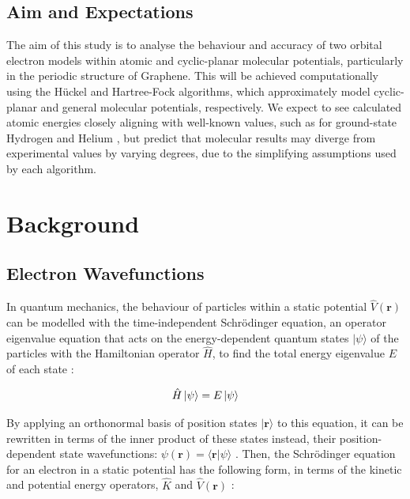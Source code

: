 \section{Aim and Expectations}

The aim of this study is to analyse the behaviour and accuracy of two orbital electron models within atomic and cyclic-planar molecular potentials, particularly in the periodic structure of Graphene. This will be achieved computationally using the Hückel \cite{yates_huckel_2012} and Hartree-Fock \cite{quiney_art_nodate} algorithms, which approximately model cyclic-planar and general molecular potentials, respectively. We expect to see calculated atomic energies closely aligning with well-known values, such as for ground-state Hydrogen \cite{pinke_origin_2025} and Helium \cite{nascimento_determination_2005}, but predict that molecular results may diverge from experimental values by varying degrees, due to the simplifying assumptions used by each algorithm. 

\chapter{Background}\label{ch:background}

\section{Electron Wavefunctions}\label{sec:electronwavefunction}

In quantum mechanics, the behaviour of particles within a static potential $\hat{V}(\boldsymbol{r})$ can be modelled with the time-independent Schrödinger equation, an operator eigenvalue equation that acts on the energy-dependent quantum states $|\psi\rangle$ of the particles with the Hamiltonian operator $\hat{H}$, to find the total energy eigenvalue $E$ of each state \cite{nalewajski_perspectives_2012}:

\begin{equation}
\hat{H}\thinspace|\psi\rangle=E\thinspace|\psi\rangle
\end{equation}

By applying an orthonormal basis of position states $|\boldsymbol{r}\rangle$ to this equation, it can be rewritten in terms of the inner product of these states instead, their position-dependent state wavefunctions: $\psi(\boldsymbol{r})=\langle\boldsymbol{r}|\psi\rangle$ \cite{nalewajski_perspectives_2012}. Then, the Schrödinger equation for an electron in a static potential has the following form, in terms of the kinetic and potential energy operators, $\hat{K}$ and $\hat{V}(\boldsymbol{r})$ \cite{quiney_art_nodate}:


